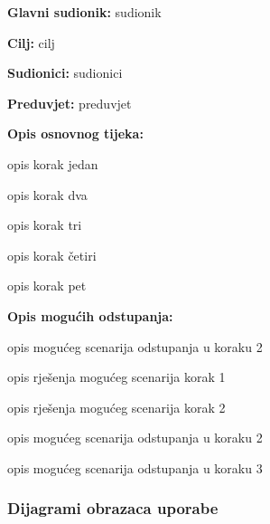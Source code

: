 					\noindent {}
					\begin{packed_item}
						
						\item \textbf{Glavni sudionik: }sudionik
						\item  \textbf{Cilj:} cilj
						\item  \textbf{Sudionici:} sudionici
						\item  \textbf{Preduvjet:} preduvjet
						\item  \textbf{Opis osnovnog tijeka:}
						
						\item[] \begin{packed_enum}
							
							\item opis korak jedan
							\item opis korak dva
							\item opis korak tri
							\item opis korak četiri
							\item opis korak pet
						\end{packed_enum}
						
						\item  \textbf{Opis mogućih odstupanja:}
						
						\item[] \begin{packed_item}
							
							\item[2.a] opis mogućeg scenarija odstupanja u koraku 2
							\item[] \begin{packed_enum}
								
								\item opis rješenja mogućeg scenarija korak 1
								\item opis rješenja mogućeg scenarija korak 2
								
							\end{packed_enum}
							\item[2.b] opis mogućeg scenarija odstupanja u koraku 2
							\item[3.a] opis mogućeg scenarija odstupanja  u koraku 3
							
						\end{packed_item}
					\end{packed_item}
				
					
				\subsubsection{Dijagrami obrazaca uporabe}
					

